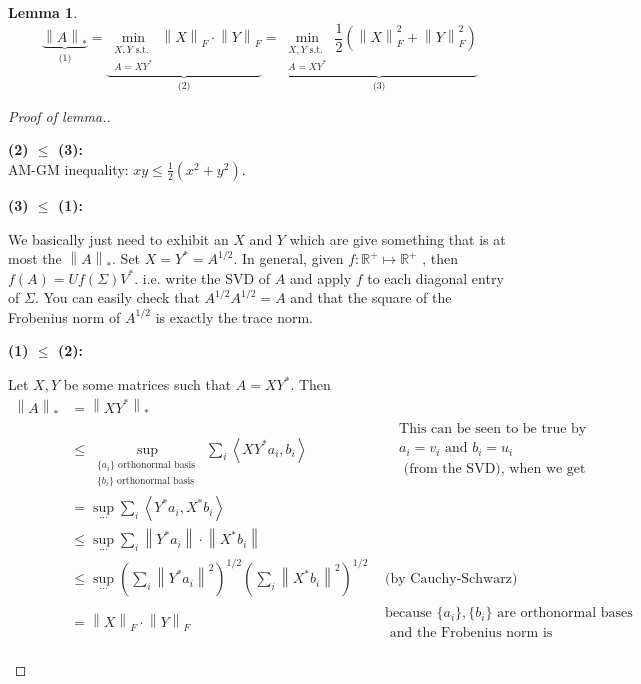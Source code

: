\documentclass[11pt]{article}
\newcommand{\inprod}[1]{\left\langle #1 \right\rangle}
\newcommand{\norm}[1]{\left\| #1 \right\|}
\newtheorem{lemma}[theorem]{Lemma}
\begin{document}
\begin{lemma}
\[
\underbrace{\norm{A}_{*}}_\text{(1)} = 
\underbrace{\min_{\substack{X, Y \text{ s.t.} \\ A = XY^*}} \norm{X}_F \cdot \norm{Y}_F}_\text{(2)} =
\underbrace{\min_{\substack{X, Y \text{ s.t.} \\ A = XY^*}} \frac{1}{2} \left(\norm{X}_F^2 + \norm{Y}_F^2 \right)}_\text{(3)}
\]
\end{lemma}
\begin{proof}[Proof of lemma.] \ 

\noindent \textbf{(2) $\le$ (3):}
\\
\indent AM-GM inequality: $ xy \le \frac{1}{2} (x^2 + y^2)$.

\noindent \textbf{(3) $\le$ (1):} 
\noindent\begin{adjustwidth}{0.5cm}{0pt}
We basically just need to exhibit an $X$ and $Y$ which are give something that is at most the $\norm{A}_*$.
Set $X = Y^* = A^{1/2}$.
 In general, given $f: \mathbb{R}^+ \mapsto \mathbb{R}^+$ , then $ f(A) = Uf(\Sigma) V^*$. i.e. write the SVD of $A$ and apply $f$ to each diagonal entry of $\Sigma$. You can easily check that $A^{1/2} A^{1/2} = A$ and that the square of the Frobenius norm of $A^{1/2}$ is exactly the trace norm.
\end{adjustwidth}

\noindent \textbf{(1) $\le$ (2):}
\begin{adjustwidth}{0.5cm}{0pt}
Let $X, Y$ be some matrices such that $A = XY^*$. Then
\allowdisplaybreaks
 \begin{align}
\nonumber  \norm{A}_* &= \norm{XY^*}_* \\
\nonumber  &\le \sup_{\substack{\{a_i\} \text{ orthonormal basis } \\ \{b_i\} \text{ orthonormal basis }  } } \sum_i \inprod{ XY^* a_i, b_i  } & \hspace{1em} \substack{\text{This can be seen to be true by letting } \\ a_i = v_i  \text{ and } b_i = u_i \\ \text{ (from the SVD), when we get equality.}} \\
\nonumber  & = \sup_{\cdots} \sum_i \inprod{Y^* a_i, X^* b_i } \\
\nonumber  & \le \sup_{\cdots} \sum_i \norm{Y^* a_i}  \cdot \norm{X^* b_i} \\
  & \le \sup_{\cdots} (\sum_i \norm{Y^* a_i}^2)^{1/2}  (\sum_i \norm{X^* b_i}^2)^{1/2} & \substack{\text{(by Cauchy-Schwarz)}} \label{eqn:cs}\\
\nonumber  &  = \norm{X}_F \cdot \norm{Y}_F & \substack{\text{because } \{a_i\}, \{b_i\} \text{ are orthonormal bases }\\ \text{ and the Frobenius norm is rotationally invariant}  }
 \end{align}
 \end{adjustwidth}

\end{proof}
\end{document}
